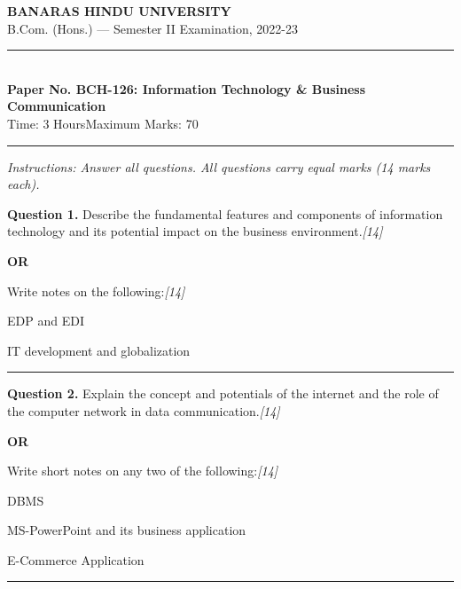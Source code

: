 \documentclass[11pt,a4paper]{article}
\newcommand{\pts}[1]{\hfill   \textit{[#1]}}
\begin{document}
\begin{center}
  {\large\bfseries BANARAS HINDU UNIVERSITY}\\[2pt]
  {\normalsize B.Com. (Hons.) --- Semester II Examination, 2022-23}\\[6pt]
  \rule{0.8\linewidth}{0.5pt}\\[6pt]
  {\large\bfseries Paper No. BCH-126: Information Technology \& Business Communication}\\[4pt]
  {\normalsize Time: 3 Hours\hfill Maximum Marks: 70}
\end{center}

\rule{\linewidth}{0.4pt}

\smallskip



\noindent   \textit{Instructions: Answer all questions. All questions carry equal marks (14 marks each).}

\bigskip




\noindent   \textbf{Question 1.}
Describe the fundamental features and components of information technology and its potential impact on the business environment.\pts{14}

\centerline{   \textbf{OR}}

Write notes on the following:\pts{14}

\begin{parts}
  \item EDP and EDI
  \item IT development and globalization
\end{parts}

\medskip\rule{\linewidth}{0.2pt}




\noindent   \textbf{Question 2.}
Explain the concept and potentials of the internet and the role of the computer network in data communication.\pts{14}

\centerline{   \textbf{OR}}

Write short notes on any two of the following:\pts{14}

\begin{parts}
  \item DBMS
  \item MS-PowerPoint and its business application
  \item E-Commerce Application
\end{parts}

\medskip\rule{\linewidth}{0.2pt}
\end{document}
